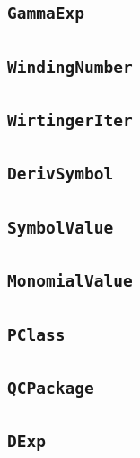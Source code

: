 \documentclass[11pt]{amsart}
\theoremstyle{definition}
\begin{document}
\subsection{\texorpdfstring{\texttt{GammaExp}}{GammaExp}}\label{node:GammaExp}


\subsection{\texorpdfstring{\texttt{WindingNumber}}{WindingNumber}}\label{node:WindingNumber}


\subsection{\texorpdfstring{\texttt{WirtingerIter}}{WirtingerIter}}\label{node:WirtingerIter}


\subsection{\texorpdfstring{\texttt{DerivSymbol}}{DerivSymbol}}\label{node:DerivSymbol}


\subsection{\texorpdfstring{\texttt{SymbolValue}}{SymbolValue}}\label{node:SymbolValue}


\subsection{\texorpdfstring{\texttt{MonomialValue}}{MonomialValue}}\label{node:MonomialValue}


\subsection{\texorpdfstring{\texttt{PClass}}{PClass}}\label{node:PClass}


\subsection{\texorpdfstring{\texttt{QCPackage}}{QCPackage}}\label{node:QCPackage}


\subsection{\texorpdfstring{\texttt{DExp}}{DExp}}\label{node:DExp}

\end{document}
